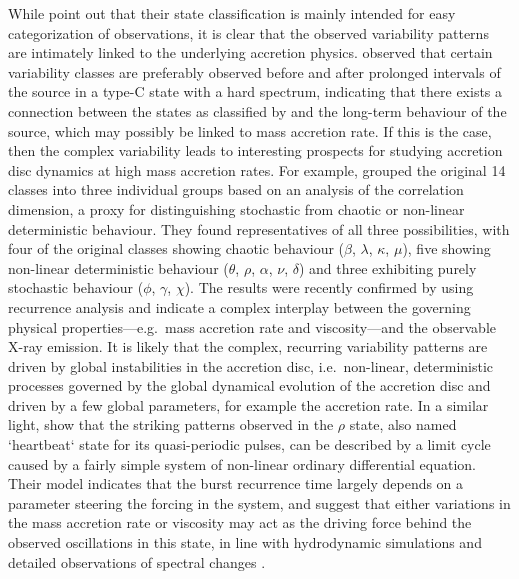 \documentclass[12pt]{emulateapj}
\begin{document}
While \citet{belloni2000} point out that their state classification is mainly intended for easy categorization of observations, it is clear that the observed variability patterns are intimately linked to the underlying accretion physics. \citet{naik2002} observed that certain variability classes are preferably observed before and after prolonged intervals of the source in a type-C state with a hard spectrum, indicating that there exists a connection between the states as classified by \citet{belloni2000} and the long-term behaviour of the source, which may possibly be linked to mass accretion rate. If this is the case, then the complex variability leads to interesting prospects for studying accretion disc dynamics at high mass accretion rates. 
For example, \citet{misra2004, misra2006} grouped the original 14 classes into three individual groups based on an analysis of the correlation dimension, a proxy for distinguishing stochastic from chaotic or non-linear deterministic behaviour. They found representatives of all three possibilities, with four of the original classes showing chaotic behaviour ($\beta$, $\lambda$, $\kappa$, $\mu$), five showing non-linear deterministic behaviour ($\theta$, $\rho$, $\alpha$, $\nu$, $\delta$) and three exhibiting purely stochastic behaviour ($\phi$, $\gamma$, $\chi$). The results were recently confirmed by \citet{sukova2016} using recurrence analysis and indicate a complex interplay between the governing physical properties---e.g.\ mass accretion rate and viscosity---and the observable X-ray emission. 
It is likely that the complex, recurring variability patterns are driven by global instabilities in the accretion disc, i.e.\ non-linear, deterministic processes governed by the global dynamical evolution of the accretion disc and driven by a few global parameters, for example the accretion rate. In a similar light, \citet{massaro2014} show that the striking patterns observed in the $\rho$ state, also named `heartbeat` state for its quasi-periodic pulses, can be described by a limit cycle caused by a fairly simple system of non-linear ordinary differential equation. Their model indicates that the burst recurrence time largely depends on a parameter steering the forcing in the system, and suggest that either variations in the mass accretion rate or viscosity may act as the driving force behind the observed oscillations in this state, in line with hydrodynamic simulations \citep{nayakshin2000, merloni2006} and detailed observations of spectral changes \citep{neilsen2010, 2011}.
\end{document}
